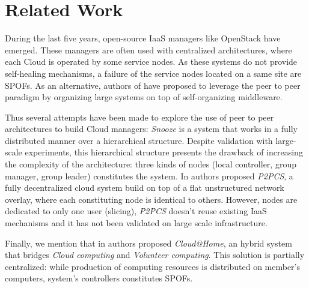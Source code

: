 \section{Related Work}
During the last five years, open-source IaaS managers like OpenStack have 
emerged. These managers are often used with centralized architectures, where 
each Cloud is operated by some service nodes. As these systems do not provide 
self-healing mechanisms, a failure of the service nodes located on a same site 
are SPOFs. As an alternative, authors of \cite{Babaoglu} have proposed to 
leverage the peer to peer paradigm by organizing large systems on top of 
self-organizing middleware.  

Thus several attempts have been made to explore the use of peer to peer 
architectures to build Cloud managers: \emph{Snooze} \cite{feller:snooze2012} is 
a system that works in a fully distributed manner over a hierarchical 
structure. Despite validation with large-scale experiments, this hierarchical 
structure presents the drawback of increasing the complexity of the 
architecture: three kinds of nodes (local controller, group manager, group 
leader) constitutes the system. In \cite{babaoglu:design2012} authors proposed 
\emph{P2PCS}, a fully decentralized cloud system build on top of a flat 
unstructured network overlay, where each constituting node is identical to 
others. However, nodes are dedicated to only one user (slicing), \emph{P2PCS} 
doesn't reuse existing IaaS mechanisms and it has not been validated on large 
scale infrastructure.

Finally, we mention that in \cite{cunsolo:cloud2009} authors proposed 
\emph{Cloud@Home}, an hybrid system that bridges \emph{Cloud computing} and 
\emph{Volunteer computing}. This solution is partially centralized: while 
production of computing resources is distributed on member's computers, 
system's controllers constitutes SPOFs.